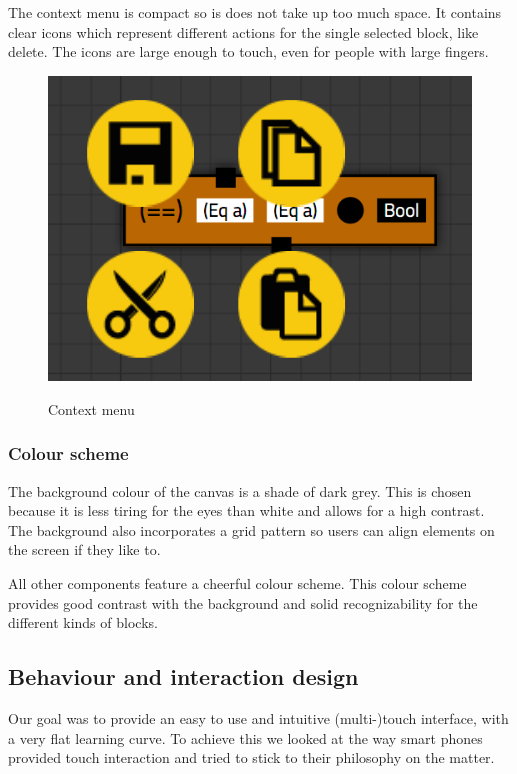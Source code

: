 The context menu is compact so is does not take up too much space. 
It contains clear icons which represent different actions for the single selected block, like delete.
The icons are large enough to touch, even for people with large fingers.

\begin{figure}[p]
	\centering
	\includegraphics[scale=0.5]{Images/blocks-menu}
	\label{fig:blocks-menu}
	\caption{Context menu}
\end{figure}

\subsubsection{Colour scheme}

The background colour of the canvas is a shade of dark grey.
This is chosen because it is less tiring for the eyes than white and allows for a high contrast.
The background also incorporates a grid pattern so users can align elements on the screen if they like to.

All other components feature a cheerful colour scheme.
This colour scheme provides good contrast with the background and solid recognizability for the different kinds of blocks.

\subsection{Behaviour and interaction design}

Our goal was to provide an easy to use and intuitive (multi-)touch interface, with a very flat learning curve. To achieve this we looked at the way smart phones provided touch interaction and tried to stick to their philosophy on the matter.

